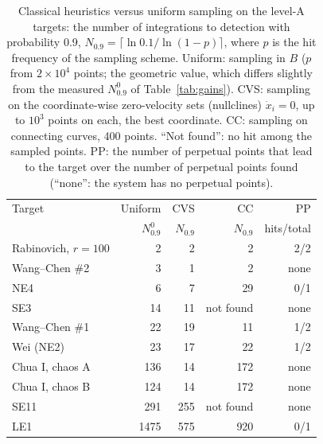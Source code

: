 
\begin{table}[tbhp]
\centering
\caption{Classical heuristics versus uniform sampling on the level-A targets: the number of integrations to detection with probability 0.9, $N_{0.9}=\lceil\ln0.1/\ln(1-p)\rceil$, where $p$ is the hit frequency of the sampling scheme. Uniform: sampling in $B$ ($p$ from $2\times10^4$ points; the geometric value, which differs slightly from the measured $N^0_{0.9}$ of Table~\ref{tab:gains}). CVS: sampling on the coordinate-wise zero-velocity sets (nullclines) $\dot x_i=0$, up to $10^3$ points on each, the best coordinate. CC: sampling on connecting curves, 400 points. ``Not found'': no hit among the sampled points. PP: the number of perpetual points that lead to the target over the number of perpetual points found (``none'': the system has no perpetual points).}
\label{tab:classic}
\footnotesize
\setlength{\tabcolsep}{3pt}

\begin{tabular}{lrrrr}
\toprule
Target & Uniform & CVS & CC & PP \\
 & $N^0_{0.9}$ & $N_{0.9}$ & $N_{0.9}$ & hits/total \\
\midrule
Rabinovich, $r=100$ & 2 & 2 & 2 & 2/2 \\
Wang--Chen \#2 & 3 & 1 & 2 & none \\
NE4 & 6 & 7 & 29 & 0/1 \\
SE3 & 14 & 11 & not found & none \\
Wang--Chen \#1 & 22 & 19 & 11 & 1/2 \\
Wei (NE2) & 23 & 17 & 22 & 1/2 \\
Chua I, chaos A\footnotemark[1] & 136 & 14 & 172 & none \\
Chua I, chaos B\footnotemark[1] & 124 & 14 & 172 & none \\
SE11 & 291 & 255 & not found & none \\
LE1 & 1475 & 575 & 920 & 0/1 \\
\bottomrule
\end{tabular}

\end{table}

